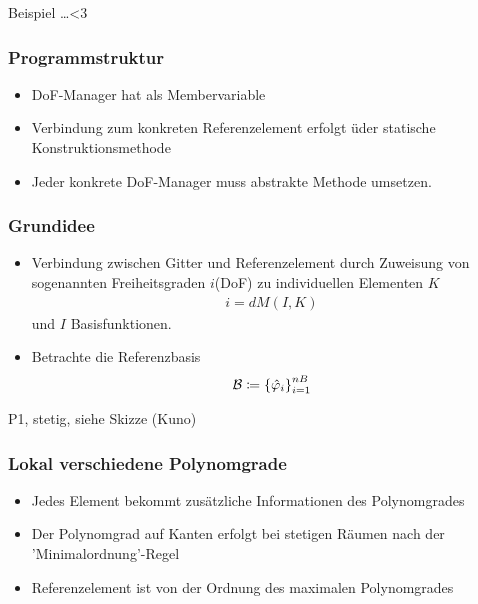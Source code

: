 Beispiel \dots <3
\subsubsection{Programmstruktur}
\begin{itemize}
\item DoF-Manager hat  als Membervariable
\item Verbindung zum konkreten Referenzelement erfolgt üder statische Konstruktionsmethode 
\item Jeder konkrete DoF-Manager muss abstrakte Methode  umsetzen. 
\end{itemize}
\subsubsection{Grundidee}
\begin{itemize}
\item Verbindung zwischen Gitter und Referenzelement durch Zuweisung von sogenannten Freiheitsgraden $i$(DoF) zu individuellen Elementen $K$
  \begin{align*}
    i = dM(I, K)
  \end{align*}
und $I$ Basisfunktionen. 
\item Betrachte die Referenzbasis
\begin{align*}
  {\cal B} \coloneqq \left\{ \hat {\varphi}_i \right\}_{i = 1}^{nB}
\end{align*}
\end{itemize}
\begin{beispiel*}
  P1, stetig, siehe Skizze (Kuno)
\end{beispiel*}
\subsubsection{Lokal verschiedene Polynomgrade}
\begin{itemize}
\item Jedes Element bekommt zusätzliche Informationen des Polynomgrades
\item Der Polynomgrad auf Kanten erfolgt bei stetigen Räumen nach der 'Minimalordnung'-Regel 
\item Referenzelement ist von der Ordnung des maximalen Polynomgrades
\end{itemize}

